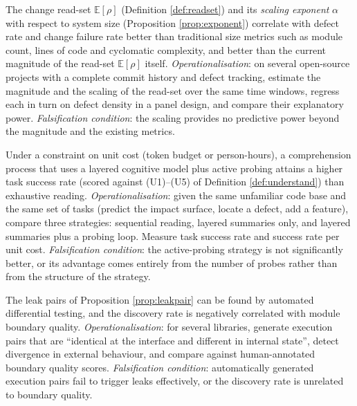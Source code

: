 \begin{hypothesis}\label{hyp:h4}
The change read-set $\mathbb{E}[\rho]$ (Definition \ref{def:readset}) and its \emph{scaling
exponent} $\alpha$ with respect to system size (Proposition \ref{prop:exponent}) correlate
with defect rate and change failure rate better than traditional size metrics such as
module count, lines of code and cyclomatic complexity, and better than the current magnitude
of the read-set $\mathbb{E}[\rho]$ itself.
\emph{Operationalisation}: on several open-source projects with a complete commit history
and defect tracking, estimate the magnitude and the scaling of the read-set over the same
time windows, regress each in turn on defect density in a panel design, and compare their
explanatory power.
\emph{Falsification condition}: the scaling provides no predictive power beyond the
magnitude and the existing metrics.
\end{hypothesis}

\begin{hypothesis}\label{hyp:h5}
Under a constraint on unit cost (token budget or person-hours), a comprehension process
that uses a layered cognitive model plus active probing attains a higher task success rate
(scored against (U1)--(U5) of Definition \ref{def:understand}) than exhaustive reading.
\emph{Operationalisation}: given the same unfamiliar code base and the same set of tasks
(predict the impact surface, locate a defect, add a feature), compare three strategies:
sequential reading, layered summaries only, and layered summaries plus a probing loop.
Measure task success rate and success rate per unit cost.
\emph{Falsification condition}: the active-probing strategy is not significantly better, or
its advantage comes entirely from the number of probes rather than from the structure of the
strategy.
\end{hypothesis}

\begin{hypothesis}\label{hyp:h6}
The leak pairs of Proposition \ref{prop:leakpair} can be found by automated differential
testing, and the discovery rate is negatively correlated with module boundary quality.
\emph{Operationalisation}: for several libraries, generate execution pairs that are
``identical at the interface and different in internal state'', detect divergence in
external behaviour, and compare against human-annotated boundary quality scores.
\emph{Falsification condition}: automatically generated execution pairs fail to trigger
leaks effectively, or the discovery rate is unrelated to boundary quality.
\end{hypothesis}

